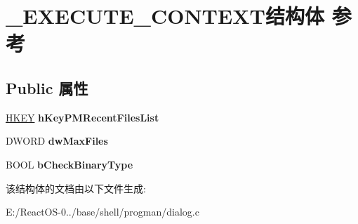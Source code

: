 \hypertarget{struct___e_x_e_c_u_t_e___c_o_n_t_e_x_t}{}\section{\+\_\+\+E\+X\+E\+C\+U\+T\+E\+\_\+\+C\+O\+N\+T\+E\+X\+T结构体 参考}
\label{struct___e_x_e_c_u_t_e___c_o_n_t_e_x_t}
\subsection*{Public 属性}
\begin{DoxyCompactItemize}
\item 
\mbox{\label{struct___e_x_e_c_u_t_e___c_o_n_t_e_x_t_a5b4d0df9661935f4cdd1680a2562332f}} 
\hyperlink{interfacevoid}{H\+K\+EY} {\bfseries h\+Key\+P\+M\+Recent\+Files\+List}
\item 
\mbox{\label{struct___e_x_e_c_u_t_e___c_o_n_t_e_x_t_a6bb736877b493aae582d9562ff735986}} 
D\+W\+O\+RD {\bfseries dw\+Max\+Files}
\item 
\mbox{\label{struct___e_x_e_c_u_t_e___c_o_n_t_e_x_t_a1293cef5b70bb9fe0deade0c249efb78}} 
B\+O\+OL {\bfseries b\+Check\+Binary\+Type}
\end{DoxyCompactItemize}


该结构体的文档由以下文件生成\+:\begin{DoxyCompactItemize}
\item 
E\+:/\+React\+O\+S-\/0../base/shell/progman/dialog.\+c\end{DoxyCompactItemize}
